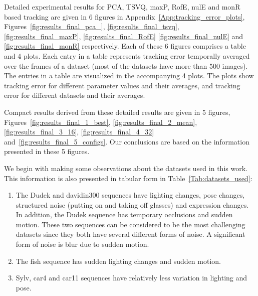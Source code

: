 Detailed experimental results for PCA, TSVQ, maxP, RofE, nulE and monR based tracking are given in 6 figures in Appendix~\ref{App:tracking_error_plots}, Figures~\ref{fig:results_final_pca_}, \ref{fig:results_final_tsvq}, \ref{fig:results_final_maxP}, \ref{fig:results_final_RofE} \ref{fig:results_final_nulE} and \ref{fig:results_final_monR} respectively.  Each of these 6 figures comprises a table and 4 plots.  Each entry in a table represents tracking error temporally averaged over the frames of a dataset (most of the datasets have more than 500 images).  The entries in a table are visualized in the accompanying 4 plots.  The plots show tracking error for different parameter values and their averages, and tracking error for different datasets and their averages.  

Compact results derived from these detailed results are given in 5 figures, Figures~\ref{fig:results_final_1_best}, \ref{fig:results_final_2_mean}, \ref{fig:results_final_3_16}, \ref{fig:results_final_4_32} and~\ref{fig:results_final_5_configs}.  Our conclusions are based on the information presented in these 5 figures. 

We begin with making some observations about the datasets used in this work.  This information is also presented in tabular form in Table~\ref{Tab:datasets_used}:

\begin{enumerate}
\item The Dudek and davidin300 sequences have lighting changes, pose changes, structured noise (putting on and taking off glasses) and expression changes.  In addition, the Dudek sequence has temporary occlusions and sudden motion.  These two sequences can be considered to be the most challenging datasets since they both have several different forms of noise.  A significant form of noise is blur due to sudden motion.  
\item The fish sequence has sudden lighting changes and sudden motion.
\item Sylv, car4 and car11 sequences have relatively less variation in lighting and pose.
\end{enumerate}



